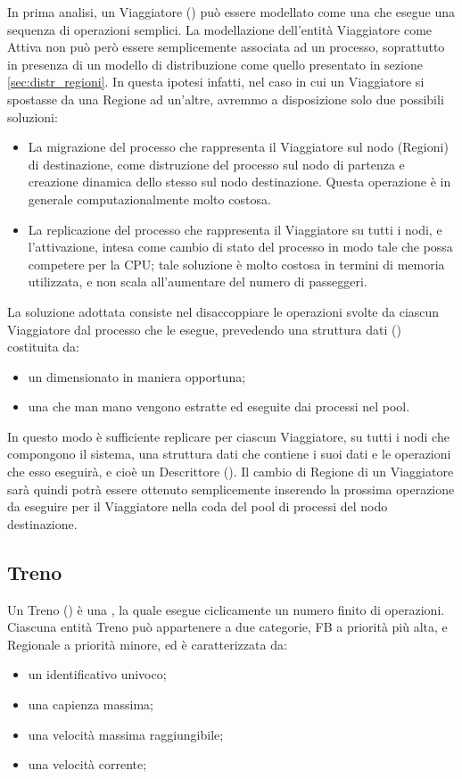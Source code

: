 	In prima analisi, un Viaggiatore () può essere modellato come una  che esegue una sequenza di operazioni semplici.
	La modellazione dell'entità Viaggiatore come Attiva non può però essere semplicemente associata ad un processo, soprattutto in presenza di un modello di distribuzione come quello presentato in sezione \ref{sec:distr_regioni}.
	In questa ipotesi infatti, nel caso in cui un Viaggiatore si spostasse da una Regione ad un'altre, avremmo a disposizione solo due possibili soluzioni:
		\begin{itemize}
			\item La migrazione del processo che rappresenta il Viaggiatore sul nodo (Regioni) di destinazione, come distruzione del processo sul nodo di partenza e creazione dinamica dello stesso sul nodo destinazione. Questa operazione è in generale computazionalmente molto costosa. 
			\item La replicazione del processo che rappresenta il Viaggiatore su tutti i nodi, e l'attivazione, intesa come cambio di stato del processo in modo tale che possa competere per la CPU; tale soluzione è molto costosa in termini di memoria utilizzata, e non scala all'aumentare del numero di passeggeri.
		\end{itemize}
	La soluzione adottata consiste nel disaccoppiare le operazioni svolte da ciascun Viaggiatore dal processo che le esegue, prevedendo una struttura dati () costituita da:
		\begin{itemize}
			\item un  dimensionato in maniera opportuna;
			\item una  che man mano vengono estratte ed eseguite dai processi nel pool.
		\end{itemize}
	In questo modo è sufficiente replicare per ciascun Viaggiatore, su tutti i nodi che compongono il sistema, una struttura dati che contiene i suoi dati e le operazioni che esso eseguirà, e cioè un Descrittore (). 
	Il cambio di Regione di un Viaggiatore sarà quindi potrà essere ottenuto semplicemente inserendo la prossima operazione da eseguire per il Viaggiatore nella coda del pool di processi del nodo destinazione.
	
	\subsection{Treno}
	Un Treno () è una , la quale esegue ciclicamente un numero finito di operazioni. Ciascuna entità Treno può appartenere a due categorie, FB a priorità più alta, e Regionale a priorità minore, ed è caratterizzata da:
		\begin{itemize}
			\item un identificativo univoco;
			\item una capienza massima;
			\item una velocità massima raggiungibile;
			\item una velocità corrente;
		\end{itemize}
	
